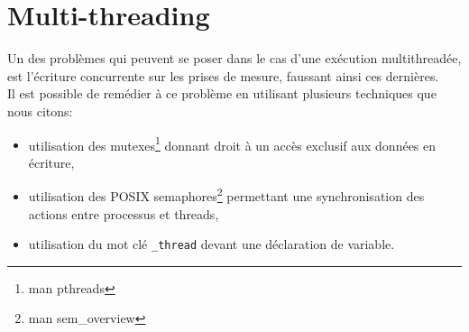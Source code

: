 %

\section{Multi-threading}

Un des problèmes qui peuvent se poser dans le cas d'une exécution multithreadée, est l'écriture concurrente sur les prises de mesure, faussant ainsi ces dernières.\\

Il est possible de remédier à ce problème en utilisant plusieurs techniques que nous citons:\\

\begin{itemize}

\item utilisation des mutexes\footnote{man pthreads} donnant droit à un accès exclusif aux données en écriture,\\

\item utilisation des POSIX semaphores\footnote{man sem\_overview} permettant une synchronisation des actions entre processus et threads,\\

\item utilisation du mot clé \verb#_thread# devant une déclaration de variable.\\

\end{itemize}
